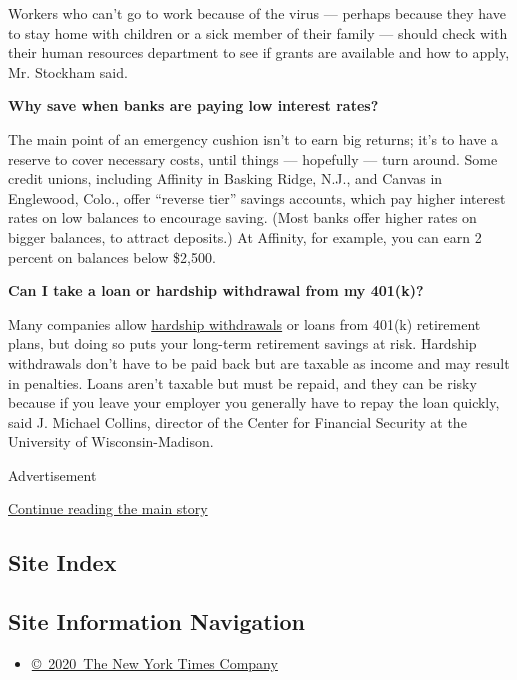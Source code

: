 Workers who can't go to work because of the virus --- perhaps because
they have to stay home with children or a sick member of their family
--- should check with their human resources department to see if grants
are available and how to apply, Mr. Stockham said.

\textbf{Why save when banks are paying low interest rates?}

The main point of an emergency cushion isn't to earn big returns; it's
to have a reserve to cover necessary costs, until things --- hopefully
--- turn around. Some credit unions, including Affinity in Basking
Ridge, N.J., and Canvas in Englewood, Colo., offer ``reverse tier''
savings accounts, which pay higher interest rates on low balances to
encourage saving. (Most banks offer higher rates on bigger balances, to
attract deposits.) At Affinity, for example, you can earn 2 percent on
balances below \$2,500.

\textbf{Can I take a loan or hardship withdrawal from my 401(k)?}

Many companies allow
\href{https://www.irs.gov/retirement-plans/hardships-early-withdrawals-and-loans}{hardship
withdrawals} or loans from 401(k) retirement plans, but doing so puts
your long-term retirement savings at risk. Hardship withdrawals don't
have to be paid back but are taxable as income and may result in
penalties. Loans aren't taxable but must be repaid, and they can be
risky because if you leave your employer you generally have to repay the
loan quickly, said J. Michael Collins, director of the Center for
Financial Security at the University of Wisconsin-Madison.

Advertisement

\protect\hyperlink{after-bottom}{Continue reading the main story}

\hypertarget{site-index}{%
\subsection{Site Index}\label{site-index}}

\hypertarget{site-information-navigation}{%
\subsection{Site Information
Navigation}\label{site-information-navigation}}

\begin{itemize}
\tightlist
\item
  \href{https://help.nytimes3xbfgragh.onion/hc/en-us/articles/115014792127-Copyright-notice}{©~2020~The
  New York Times Company}
\end{itemize}

